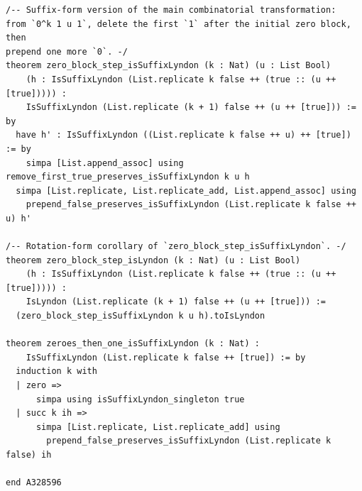 \documentclass[11pt]{article}
\theoremstyle{definition}
\theoremstyle{remark}
\begin{document}
\begin{lstlisting}
/-- Suffix-form version of the main combinatorial transformation:
from `0^k 1 u 1`, delete the first `1` after the initial zero block, then
prepend one more `0`. -/
theorem zero_block_step_isSuffixLyndon (k : Nat) (u : List Bool)
    (h : IsSuffixLyndon (List.replicate k false ++ (true :: (u ++ [true])))) :
    IsSuffixLyndon (List.replicate (k + 1) false ++ (u ++ [true])) := by
  have h' : IsSuffixLyndon ((List.replicate k false ++ u) ++ [true]) := by
    simpa [List.append_assoc] using remove_first_true_preserves_isSuffixLyndon k u h
  simpa [List.replicate, List.replicate_add, List.append_assoc] using
    prepend_false_preserves_isSuffixLyndon (List.replicate k false ++ u) h'

/-- Rotation-form corollary of `zero_block_step_isSuffixLyndon`. -/
theorem zero_block_step_isLyndon (k : Nat) (u : List Bool)
    (h : IsSuffixLyndon (List.replicate k false ++ (true :: (u ++ [true])))) :
    IsLyndon (List.replicate (k + 1) false ++ (u ++ [true])) :=
  (zero_block_step_isSuffixLyndon k u h).toIsLyndon

theorem zeroes_then_one_isSuffixLyndon (k : Nat) :
    IsSuffixLyndon (List.replicate k false ++ [true]) := by
  induction k with
  | zero =>
      simpa using isSuffixLyndon_singleton true
  | succ k ih =>
      simpa [List.replicate, List.replicate_add] using
        prepend_false_preserves_isSuffixLyndon (List.replicate k false) ih

end A328596
\end{lstlisting}
\end{document}
